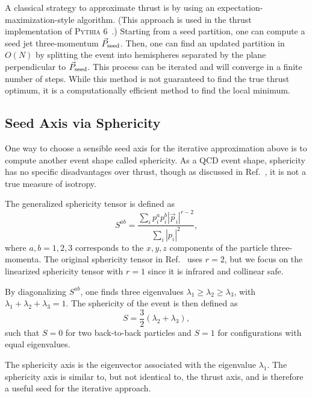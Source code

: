 \documentclass[aps,prd,twocolumn,superscriptaddress,preprintnumbers,nofootinbib,longbibliography,floatfix]{revtex4-1}
\DeclareRobustCommand{\Ref}[1]{Ref.~\cite{#1}}
\begin{document}
A classical strategy to approximate thrust is by using an expectation-maximization-style algorithm.
%
(This approach is used in the thrust implementation of \textsc{Pythia} 6~\cite{Sjostrand:2006za}.)
%
Starting from a seed partition, one can compute a seed jet three-momentum $\vec{P}_{\rm seed}$.
%
Then, one can find an updated partition in $O(N)$ by splitting the event into hemispheres separated by the plane perpendicular to $\vec{P}_{\rm seed}$.
%
This process can be iterated and will converge in a finite number of steps.
%
While this method is not guaranteed to find the true thrust optimum, it is a computationally efficient method to find the local minimum.








\subsection{Seed Axis via Sphericity}
\label{sec:sphericity}

One way to choose a sensible seed axis for the iterative approximation above is to compute another event shape called sphericity.
%
As a QCD event shape, sphericity has no specific disadvantages over thrust, though as discussed in \Ref{Cesarotti:2020hwb}, it is not a true measure of isotropy.


The generalized sphericity tensor is defined as
%
\begin{equation}
    S^{ab} = \frac{\sum_{i} p_i^a p_i^b |\vec{p}_i|^{r-2}}{\sum_i |p_i|^2},
    \label{eq:sph}
\end{equation}
%
where $a,b = 1,2,3$ corresponds to the $x,y,z$ components of the particle three-momenta.
%
The original sphericity tensor in \Ref{PhysRevD.1.1416} uses $r = 2$, but we focus on the linearized sphericity tensor with $r = 1$ since it is infrared and collinear safe.


By diagonalizing $S^{ab}$, one finds three eigenvalues $\lambda_{1}\geq \lambda_{2} \geq \lambda_{3}$, with $\lambda_{1}+\lambda_{2}+\lambda_{3} = 1$.
%
The sphericity of the event is then defined as
%
\begin{equation}
    S = \frac{3}{2}(\lambda_{2} + \lambda_{3}),
\end{equation}
%
such that $S = 0$ for two back-to-back particles and $S = 1$ for configurations with equal eigenvalues.


The sphericity axis is the eigenvector associated with the eigenvalue $\lambda_{1}$.
%
The sphericity axis is similar to, but not identical to, the thrust axis, and is therefore a useful seed for the iterative approach.
\end{document}
